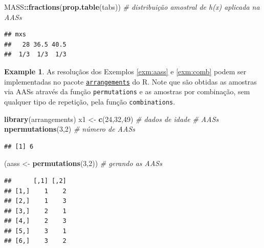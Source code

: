 \documentclass[
]{book}
\newenvironment{Shaded}{\begin{snugshade}}{\end{snugshade}}
\newcommand{\CommentTok}[1]{\textcolor[rgb]{0.56,0.35,0.01}{\textit{#1}}}
\newcommand{\DecValTok}[1]{\textcolor[rgb]{0.00,0.00,0.81}{#1}}
\newcommand{\KeywordTok}[1]{\textcolor[rgb]{0.13,0.29,0.53}{\textbf{#1}}}
\newcommand{\NormalTok}[1]{#1}
\newcommand{\OperatorTok}[1]{\textcolor[rgb]{0.81,0.36,0.00}{\textbf{#1}}}
\newcommand{\StringTok}[1]{\textcolor[rgb]{0.31,0.60,0.02}{#1}}
\theoremstyle{definition}
\theoremstyle{definition}
\newtheorem{example}{Example}[chapter]
\theoremstyle{definition}
\theoremstyle{remark}
\begin{document}
\begin{Shaded}
\begin{Highlighting}[]
\NormalTok{MASS}\OperatorTok{::}\KeywordTok{fractions}\NormalTok{(}\KeywordTok{prop.table}\NormalTok{(tabs)) }\CommentTok{\# distribuição amostral de h(x) aplicada na AASs}
\end{Highlighting}
\end{Shaded}

\begin{verbatim}
## mxs
##   28 36.5 40.5 
##  1/3  1/3  1/3
\end{verbatim}

\begin{example}
\protect\hypertarget{exm:aas-R-arr}{}{\label{exm:aas-R-arr} }As resoluçãos dos Exemplos \ref{exm:aass} e \ref{exm:comb} podem ser implementadas no pacote \href{https://cran.r-project.org/web/packages/arrangements/}{\texttt{arrangements}} do R. Note que são obtidas as amostras via AASs através da função \texttt{permutations} e as amostras por combinação, sem qualquer tipo de repetição, pela função \texttt{combinations}.
\end{example}

\begin{Shaded}
\begin{Highlighting}[]
\KeywordTok{library}\NormalTok{(arrangements)}
\NormalTok{x1 \textless{}{-}}\StringTok{ }\KeywordTok{c}\NormalTok{(}\DecValTok{24}\NormalTok{,}\DecValTok{32}\NormalTok{,}\DecValTok{49}\NormalTok{)  }\CommentTok{\# dados de idade}
\CommentTok{\# AASs}
\KeywordTok{npermutations}\NormalTok{(}\DecValTok{3}\NormalTok{,}\DecValTok{2}\NormalTok{) }\CommentTok{\# número de AASs}
\end{Highlighting}
\end{Shaded}

\begin{verbatim}
## [1] 6
\end{verbatim}

\begin{Shaded}
\begin{Highlighting}[]
\NormalTok{(aass \textless{}{-}}\StringTok{ }\KeywordTok{permutations}\NormalTok{(}\DecValTok{3}\NormalTok{,}\DecValTok{2}\NormalTok{)) }\CommentTok{\# gerando as AASs}
\end{Highlighting}
\end{Shaded}

\begin{verbatim}
##      [,1] [,2]
## [1,]    1    2
## [2,]    1    3
## [3,]    2    1
## [4,]    2    3
## [5,]    3    1
## [6,]    3    2
\end{verbatim}
\end{document}
